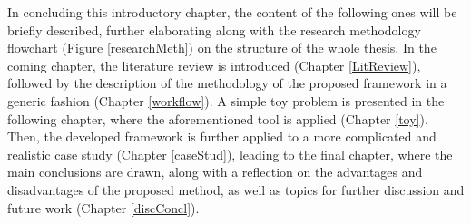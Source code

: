 In concluding this introductory chapter, the content of the following ones will be briefly described, further elaborating along with the research methodology flowchart (Figure \ref{researchMeth}) on the structure of the whole thesis. In the coming chapter, the literature review is introduced (Chapter \ref{LitReview}), followed by the description of the methodology of the proposed framework in a generic fashion (Chapter \ref{workflow}). A simple toy problem is presented in the following chapter, where the aforementioned tool is applied (Chapter \ref{toy}). Then, the developed framework is further applied to a more complicated and realistic case study (Chapter \ref{caseStud}), leading to the final chapter, where the main conclusions are drawn, along with a reflection on the advantages and disadvantages of the proposed method, as well as topics for further discussion and future work (Chapter \ref{discConcl}).